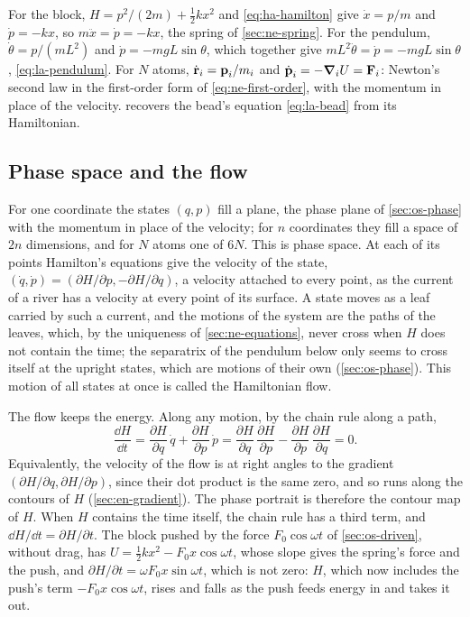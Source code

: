 For the block, $H = p^2/(2m) + \frac12 kx^2$ and \cref{eq:ha-hamilton} give $\dot{x} = p/m$ and
$\dot{p} = -kx$, so $m\ddot{x} = \dot{p} = -kx$, the spring of
\cref{sec:ne-spring}. For the pendulum, $\dot\theta = p/(mL^2)$ and
$\dot{p} = -mgL\sin\theta$, which together give $mL^2\ddot\theta = \dot{p}
= -mgL\sin\theta$, \cref{eq:la-pendulum}.
For $N$ atoms, $\dot{\bm{\mathrm{r}}}_i = \bm{\mathrm{p}}_i/m_i$ and $\dot{\bm{\mathrm{p}}}_i =
-\bm{\nabla}_iU = \bm{\mathrm{F}}_i$: Newton's second law in the first-order form of
\cref{eq:ne-first-order}, with the momentum in place of the velocity.
 recovers the bead's equation \cref{eq:la-bead} from its
Hamiltonian.

\subsection*{Phase space and the flow}

For one coordinate the states $(q, p)$ fill a plane, the phase plane of
\cref{sec:os-phase} with the momentum in place of the velocity; for $n$
coordinates they fill a space of $2n$ dimensions, and for $N$ atoms one
of $6N$. This is phase space. At each of its points Hamilton's equations
give the velocity of the state, $(\dot{q}, \dot{p}) = (\partial H/
\partial p, -\partial H/\partial q)$, a velocity attached to every point,
as the current of a river has a velocity at every point of its surface.
A state moves as a leaf carried by such a current, and the motions of
the system are the paths of the leaves, which, by the uniqueness of
\cref{sec:ne-equations}, never cross when $H$ does not contain the time;
the separatrix of the pendulum below only seems to cross itself at the
upright states, which are motions of their own (\cref{sec:os-phase}). This motion of all states at once is
called the Hamiltonian flow.

The flow keeps the energy. Along any motion, by the chain rule along a
path,
\begin{equation*}
   \frac{\dd H}{\dd t} = \frac{\partial H}{\partial q}\,\dot{q}
   + \frac{\partial H}{\partial p}\,\dot{p}
   = \frac{\partial H}{\partial q}\,\frac{\partial H}{\partial p}
   - \frac{\partial H}{\partial p}\,\frac{\partial H}{\partial q} = 0 .
\end{equation*}
Equivalently, the velocity of the flow is at right angles to the
gradient $(\partial H/\partial q, \partial H/\partial p)$, since their
dot product is the same zero, and so runs along the contours of $H$
(\cref{sec:en-gradient}). The phase portrait is therefore the contour
map of $H$. When $H$ contains the time itself, the chain rule has a third
term, and $\dd H/\dd t = \partial H/\partial t$. The block pushed by the
force $F_0\cos\omega t$ of \cref{sec:os-driven}, without drag, has $U =
\frac12 kx^2 - F_0x\cos\omega t$, whose slope gives the spring's force and
the push, and $\partial H/\partial t = \omega F_0x\sin\omega t$, which is not zero:
$H$, which now includes the push's term $-F_0x\cos\omega t$, rises and
falls as the push feeds energy in and takes it out.

